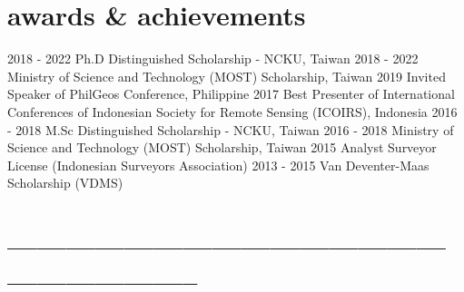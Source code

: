 \documentclass[icon]{mycvtemplate}
\begin{document}
\section {awards \& achievements}
\begin{twentyshort}
    \twentyitemshort 
    {2018 - 2022}
    {Ph.D Distinguished Scholarship - NCKU, Taiwan}
    \twentyitemshort
    {2018 - 2022}
    {Ministry of Science and Technology (MOST) Scholarship, Taiwan}
    \twentyitemshort
    {2019}
    {Invited Speaker of PhilGeos Conference, Philippine}
    \twentyitemshort
    {2017}
    {Best Presenter of International Conferences of Indonesian Society for Remote Sensing (ICOIRS), Indonesia}
    \twentyitemshort
    {2016 - 2018}
    {M.Sc Distinguished Scholarship - NCKU, Taiwan}
    \twentyitemshort
    {2016 - 2018}
    {Ministry of Science and Technology (MOST) Scholarship, Taiwan}
    \twentyitemshort
    {2015}
    {Analyst Surveyor License (Indonesian Surveyors Association)}
    \twentyitemshort
    {2013 - 2015}
    {Van Deventer-Maas Scholarship (VDMS)}
\end{twentyshort}


\section{-----------------------------------------------------------------}

\end{document}
